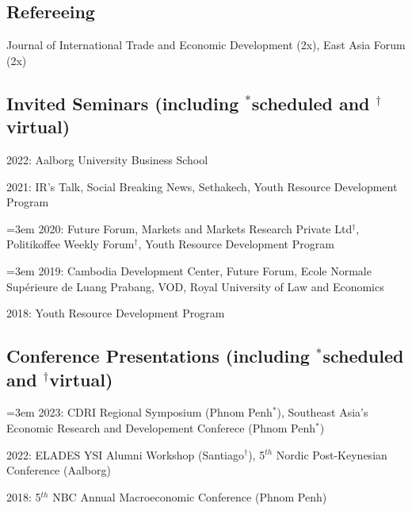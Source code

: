 \documentclass[10pt,a4paper]{article}
\begin{document}
\subsection*{Refereeing}
	
	Journal of International Trade and Economic Development (2x), East Asia Forum (2x)

\subsection*{Invited Seminars (including $^\ast$scheduled and $^\dag$virtual)}

	2022: Aalborg University Business School

	2021: IR’s Talk, Social Breaking News, Sethakech, Youth Resource Development Program
				
\hangindent=3em
	2020: Future Forum, Markets and Markets Research Private Ltd$^\dag$, Politikoffee Weekly Forum$^\dag$, Youth Resource Development Program

\hangindent=3em
	2019: Cambodia Development Center, Future Forum, Ecole Normale Supérieure de Luang Prabang, VOD, Royal University of Law and Economics

	2018: Youth Resource Development Program
	
\subsection*{Conference Presentations (including $^\ast$scheduled and $^\dag$virtual)}

\hangindent=3em
	2023:  CDRI Regional Symposium (Phnom Penh$^\ast$), Southeast Asia's Economic Research and Developement Conferece (Phnom Penh$^\ast$)
	
	
	2022:  ELADES YSI Alumni Workshop (Santiago$^\dag$), 5$^{th}$ Nordic Post-Keynesian Conference (Aalborg)

	2018: 5$^{th}$ NBC Annual Macroeconomic Conference (Phnom Penh)

\end{document}

